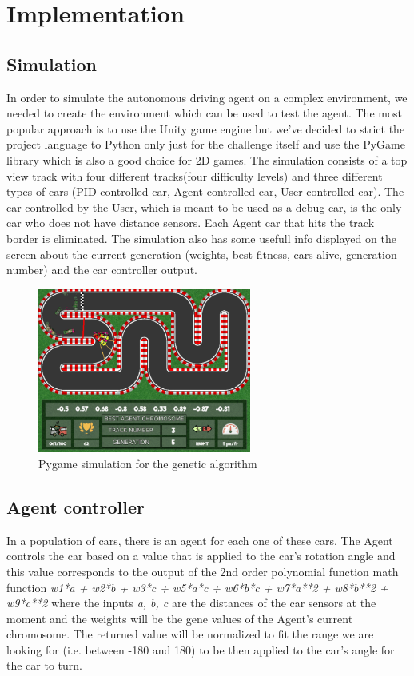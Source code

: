 \documentclass[conference]{IEEEtran}
\begin{document}
\section{Implementation}
\subsection{Simulation}
In order to simulate the autonomous driving agent on a complex environment, we needed to create the environment
which can be used to test the agent. The most popular approach is to use the Unity game engine but we've decided to strict the
project language to Python only just for the challenge itself and use the PyGame library which is also a good choice for 2D games.
The simulation consists of a top view track with four different tracks(four difficulty levels) and three different types of cars
(PID controlled car, Agent controlled car, User controlled car). The car controlled by the User, which is meant to be used as a debug car,
is the only car who does not have distance sensors. Each Agent car that hits the track border is eliminated. The simulation also has some
usefull info displayed on the screen about the current generation (weights, best fitness, cars alive, generation number) and the car controller output.

\begin{figure}[b]
    \centerline{\includegraphics[width=70mm,scale=4]{assets/simulation.png}}
    \caption{Pygame simulation for the genetic algorithm}
    \label{fig:simulation}
\end{figure}

\subsection{Agent controller}
In a population of cars, there is an agent for each one of these cars. The Agent controls the car based on a value that
is applied to the car's rotation angle and this value corresponds to the output of the 2nd order polynomial function
math function \emph{w1*a + w2*b + w3*c + w5*a*c + w6*b*c + w7*a**2 + w8*b**2 + w9*c**2} where the inputs \emph{a, b, c} are
the distances of the car sensors at the moment and the weights will be the gene values of the Agent's current
chromosome. The returned value will be normalized to fit the range we are looking for (i.e. between -180 and 180) to be then applied
to the car's angle for the car to turn.
\end{document}

